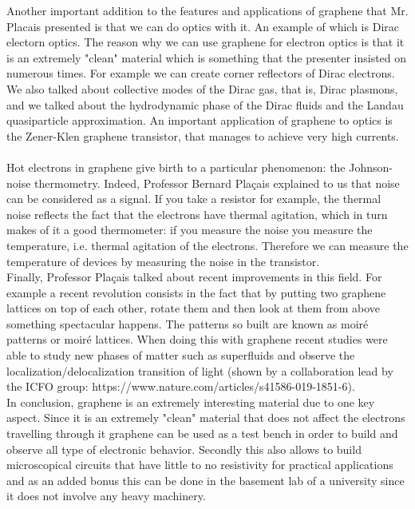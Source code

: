 \documentclass[12pt,a4paper]{article}
\begin{document}
Another important addition to the features and applications of graphene that Mr. Placais presented is that we can do optics with it. An example of which is Dirac electorn optics. The reason why we can use graphene for electron optics is that it is an extremely "clean" material which is something that the presenter insisted on numerous times. For example we can create corner reflectors of Dirac electrons. We also talked about collective modes of the Dirac gas, that is, Dirac plasmons, and we talked about the hydrodynamic phase of the Dirac fluids and the Landau quasiparticle approximation. An important application of graphene to optics is the Zener-Klen graphene transistor, that manages to achieve very high currents. \\\\
Hot electrons in graphene give birth to a particular phenomenon: the Johnson-noise thermometry. Indeed, Professor Bernard Plaçais explained to us that noise can be considered as a signal. If you take a resistor for example, the thermal noise reflects the fact that the electrons have thermal agitation, which in turn makes of it a good thermometer: if you measure the noise you measure the temperature, i.e. thermal agitation of the electrons. Therefore we can measure the temperature of devices by measuring the noise in the transistor. \\
Finally, Professor Plaçais talked about recent improvements in this field. For example a recent revolution consists in the fact that by putting two graphene lattices on top of each other, rotate them and then look at them from above something spectacular happens. The patterns so built are known as moiré patterns or moiré lattices. When doing this with graphene recent studies were able to study new phases of matter such as superfluids and observe the localization/delocalization transition of light (shown by a collaboration lead by the ICFO group: https://www.nature.com/articles/s41586-019-1851-6). \\
In conclusion, graphene is an extremely interesting material due to one key aspect. Since it is an extremely "clean" material that does not affect the electrons travelling through it graphene can be used as a test bench in order to build and observe all type of electronic behavior. Secondly this also allows to build microscopical circuits that have little to no resistivity for practical applications and as an added bonus this can be done in the basement lab of a university since it does not involve any heavy machinery. 
\end{document}
